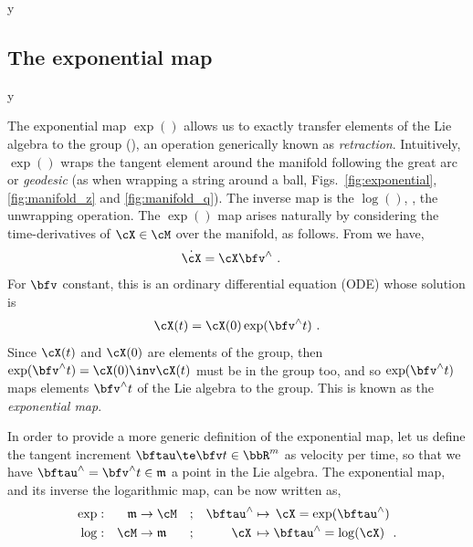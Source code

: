 \if\examples y

\fi



\subsection{The exponential map}


\if\examples y

\fi

The exponential map $\exp()$ allows us to exactly transfer elements of the Lie algebra to the group (), an operation generically known as \emph{retraction}. 
Intuitively, $\exp()$ wraps the tangent element around the manifold following the great arc or \emph{geodesic} (as when wrapping a string around a ball, Figs.~\ref{fig:exponential}, \ref{fig:manifold_z} and \ref{fig:manifold_q}).
The inverse map is the $\log()$, \ie, the unwrapping operation.
The $\exp()$ map arises naturally by considering the time-derivatives of $\cX\in\cM$ over the manifold, as follows.
%
From  we have,
%
\begin{align}\label{equ:ode}
\dot\cX &= \cX\bfv\hhat 
~.
\end{align}
%
For $\bfv$ constant, this is an ordinary differential equation (ODE) whose solution is 
%
\begin{align}\label{equ:exp_at_X}
\cX(t)  = \cX(0)\exp(\bfv\hhat t)
~.
\end{align}
%
Since $\cX(t)$ and $\cX(0)$ are elements of the group, then $\exp(\bfv\hhat t)=\cX(0)\inv\cX(t)$ must be in the group too, and so $\exp(\bfv\hhat t)$ maps elements $\bfv\hhat t$ of the Lie algebra to the group.
This is known as the \emph{exponential map}.

In order to provide a more generic definition of the exponential map, let us define the tangent increment $\bftau\te\bfv t\in\bbR^m$ as velocity per time, so that we have $\bftau\hhat=\bfv\hhat t\in\frak{m}$ a point in the Lie algebra. 
The exponential map, and its inverse the logarithmic map, can be now written as, 
%
\begin{align}
\exp &:& \frak{m} & \to\cM      
 &&; & \bftau\hhat &\mapsto \,\cX = \exp(\bftau\hhat) 
 \\
\log &:&     \cM & \to\frak{m} 
 &&; & \cX\,    &\mapsto \bftau\hhat = \log(\cX) ~
~. 
\end{align}


